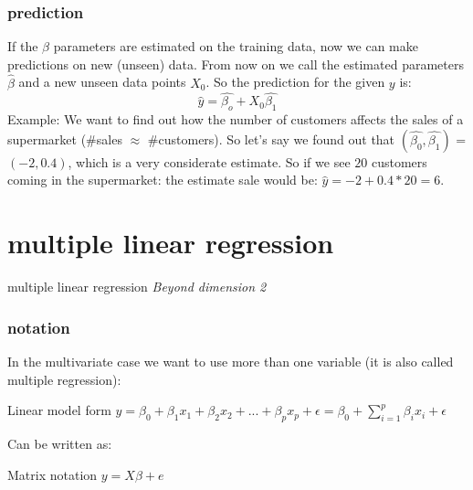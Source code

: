 \documentclass{beamer}
\begin{document}
\begin{frame}
\frametitle{prediction}
If the $\beta$ parameters are estimated on the training data, now we can make predictions on new (unseen) data. From now on we call the estimated parameters $\hat{\beta}$ and a new unseen data points $X_{0}$. So the prediction for the given $y$ is:
\begin{equation*}
\hat{y} = \hat{\beta_o} + X_{0} \hat{\beta_1}
\end{equation*}
Example: We want to find out how the number of customers affects the sales of a supermarket ($\#$sales $\approx$ $\#$customers). 
\newline
So let's say we found out that $(\hat{\beta_0} , \hat{\beta_1})$ = $(-2, 0.4)$, which is a very considerate estimate. So if we see $20$ customers coming in the supermarket: the estimate sale would be: $\hat{y} = -2+ 0.4*20 = 6$.
\end{frame}


\section{multiple linear regression}
\begin{frame}
\Huge{multiple linear regression}
\newline
\newline
\normalsize
\textit{ Beyond dimension 2 }
\end{frame}


\begin{frame}
\frametitle{notation}
In the multivariate case we want to use more than one variable (it is also called multiple regression):
\begin{block}{Linear model form}
$y = \beta_0 + \beta_1 x_1 + \beta_2 x_2 + ... + \beta_p  x_p  + \epsilon= \beta_0 + \sum_{i = 1}^p \beta_i x_i + \epsilon$
\end{block}
Can be written as:
\begin{block}{Matrix notation}
$y =  X  \beta + e$
\end{block}

\end{frame}
\end{document}
